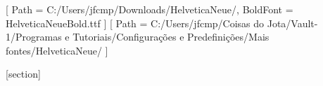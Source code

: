 \geometry{
    paper=a4paper,
    vmargin=3cm,
    hmargin=2cm,
    twocolumn=true
}


\setmainfont{Minion Pro}
\setsansfont{HelveticaNeueMedium.ttf}[
    Path = C:/Users/jfcmp/Downloads/HelveticaNeue/,
    BoldFont = HelveticaNeueBold.ttf
]
\newfontfamily{}[
    Path = C:/Users/jfcmp/Coisas do Jota/Vault-1/Programas e Tutoriais/Configurações e Predefinições/Mais fontes/HelveticaNeue/
]

\newcommand{\checkmarkmazur}{}


[section]

\newenvironment{mazurex}[1][]  %
{ %
    \refstepcounter{mazurex} %
    \par\medskip\noindent %
    {\bfseries\sffamily\color{mazurdarkblue} Exercise \thesection.\themazurex~#1} %
    \rmfamily\par\medskip\noindent %
    \begin{tcolorbox}[enhanced, 
        frame hidden, %
        arc = 0mm, %
        top=1mm, bottom=1mm, right=1mm, left=1mm, %
        colback = mazurlightblue, %
        borderline horizontal={1.5pt}{1pt}{mazurgray}] %
    \small %
}
{ %
    \end{tcolorbox}\medskip
}

\newenvironment{mazurq}{}{}

